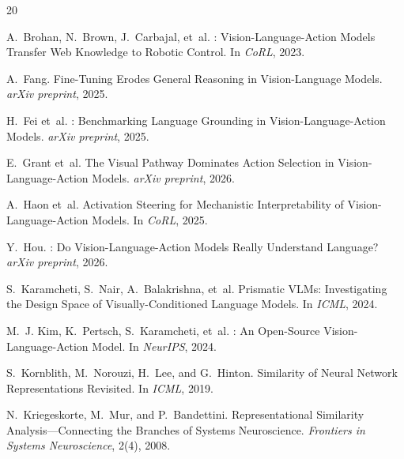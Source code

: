 \documentclass[letterpaper]{article}
\begin{document}
{\small

\begin{thebibliography}{20}

A.~Brohan, N.~Brown, J.~Carbajal, et~al.
: Vision-Language-Action Models Transfer Web Knowledge to Robotic Control.
\newblock In \emph{CoRL}, 2023.

A.~Fang.
\newblock Fine-Tuning Erodes General Reasoning in Vision-Language Models.
\newblock \emph{arXiv preprint}, 2025.

H.~Fei et~al.
: Benchmarking Language Grounding in Vision-Language-Action Models.
\newblock \emph{arXiv preprint}, 2025.

E.~Grant et~al.
\newblock The Visual Pathway Dominates Action Selection in Vision-Language-Action Models.
\newblock \emph{arXiv preprint}, 2026.

A.~Haon et~al.
\newblock Activation Steering for Mechanistic Interpretability of Vision-Language-Action Models.
\newblock In \emph{CoRL}, 2025.

Y.~Hou.
: Do Vision-Language-Action Models Really Understand Language?
\newblock \emph{arXiv preprint}, 2026.

S.~Karamcheti, S.~Nair, A.~Balakrishna, et~al.
\newblock Prismatic {VLMs}: Investigating the Design Space of Visually-Conditioned Language Models.
\newblock In \emph{ICML}, 2024.

M.~J. Kim, K.~Pertsch, S.~Karamcheti, et~al.
: An Open-Source Vision-Language-Action Model.
\newblock In \emph{NeurIPS}, 2024.

S.~Kornblith, M.~Norouzi, H.~Lee, and G.~Hinton.
\newblock Similarity of Neural Network Representations Revisited.
\newblock In \emph{ICML}, 2019.

N.~Kriegeskorte, M.~Mur, and P.~Bandettini.
\newblock Representational Similarity Analysis---Connecting the Branches of Systems Neuroscience.
\newblock \emph{Frontiers in Systems Neuroscience}, 2(4), 2008.


\end{thebibliography}}
\end{document}
